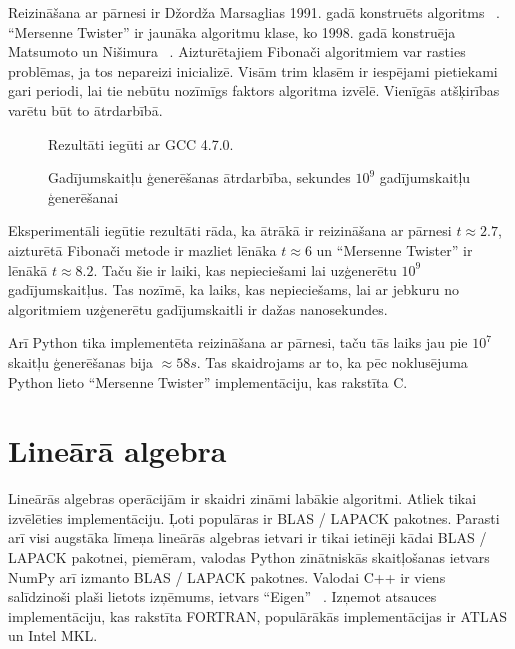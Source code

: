 \documentclass{ludis}
\begin{document}
Reizināšana ar pārnesi ir Džordža Marsaglias 1991. gadā konstruēts algoritms ~\cite{rng_new_marsaglia}. ``Mersenne Twister'' ir jaunāka algoritmu klase, ko 1998. gadā konstruēja Matsumoto un Nišimura ~\cite{rng_mersenne}. Aizturētajiem Fibonači algoritmiem var rasties problēmas, ja tos nepareizi inicializē. Visām trim klasēm ir iespējami pietiekami gari periodi, lai tie nebūtu nozīmīgs faktors algoritma izvēlē. Vienīgās atšķirības varētu būt to ātrdarbībā. 
\begin{figure}
  \centering
  \caption[Gadījumskaitļu ģeneratoru ātrdarbība]{Gadījumskaitļu ģenerēšanas ātrdarbība, sekundes $10^9$ gadījumskaitļu ģenerēšanai}
  Rezultāti iegūti ar GCC 4.7.0.
  \label{fig:rng_performance}
\end{figure}
Eksperimentāli iegūtie rezultāti rāda, ka ātrākā ir reizināšana ar pārnesi $t \approx 2.7$, aizturētā Fibonači metode ir mazliet lēnāka $t \approx 6$ un ``Mersenne Twister'' ir lēnākā $t \approx 8.2$. Taču šie ir laiki, kas nepieciešami lai uzģenerētu $10^9$ gadījumskaitļus. Tas nozīmē, ka laiks, kas nepieciešams, lai ar jebkuru no algoritmiem uzģenerētu gadījumskaitli ir dažas nanosekundes.

Arī Python tika implementēta reizināšana ar pārnesi, taču tās laiks jau pie $10^7$ skaitļu ģenerēšanas bija $\approx 58 s$. Tas skaidrojams ar to, ka pēc noklusējuma Python lieto ``Mersenne Twister'' implementāciju, kas rakstīta C.

\section{Lineārā algebra}
Lineārās algebras operācijām ir skaidri zināmi labākie algoritmi. Atliek tikai izvēlēties implementāciju. Ļoti populāras ir BLAS / LAPACK pakotnes. Parasti arī visi augstāka līmeņa lineārās algebras ietvari ir tikai ietinēji kādai BLAS / LAPACK pakotnei, piemēram, valodas Python zinātniskās skaitļošanas ietvars NumPy arī izmanto BLAS / LAPACK pakotnes. Valodai C++ ir viens salīdzinoši plaši lietots izņēmums, ietvars ``Eigen'' ~\cite{eigen_org}.  Izņemot atsauces implementāciju, kas rakstīta FORTRAN, populārākās implementācijas ir ATLAS un Intel MKL.
\end{document}
